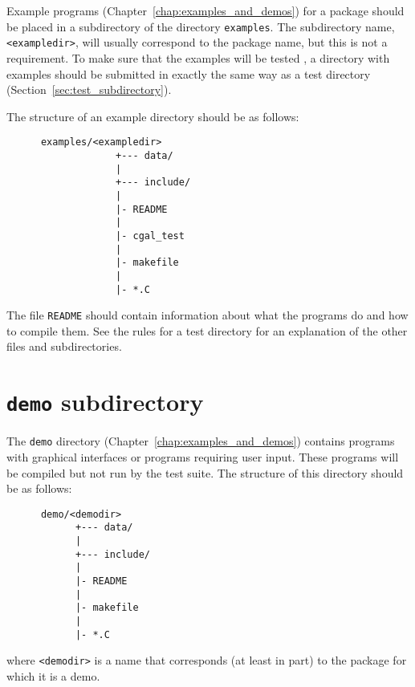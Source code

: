 Example programs (Chapter~\ref{chap:examples_and_demos}) for a package should 
be placed in a subdirectory of the directory {\tt examples}. 
The subdirectory name, \verb|<exampledir>|, will usually correspond to the 
package name, but this is not a requirement.
To make sure that the examples will be tested%
, 
a directory with examples 
should be submitted in exactly the same way as a test directory 
(Section~\ref{sec:test_subdirectory}). 

The structure of an example directory should be as follows: 
\begin{verbatim}
      examples/<exampledir>
                   +--- data/
                   |
                   +--- include/
                   |
                   |- README
                   |
                   |- cgal_test
                   |
                   |- makefile
                   |
                   |- *.C
\end{verbatim}

The file {\tt README} should contain information about what the programs do
and how to compile them. 
See the rules for a test directory for an explanation of the other files 
and subdirectories. 

\section{{\tt demo} subdirectory}
\label{sec:demo_subdirectory}

The {\tt demo} directory (Chapter~\ref{chap:examples_and_demos}) contains 
programs with graphical interfaces or programs requiring user input. These 
programs will be compiled but not run by the test suite.
The structure of this directory should be as follows: 
\begin{verbatim}
      demo/<demodir>
            +--- data/
            |
            +--- include/
            |
            |- README
            |
            |- makefile
            |
            |- *.C
\end{verbatim}
where \verb|<demodir>| is a name that corresponds (at least in part) to
the package for which it is a demo.

